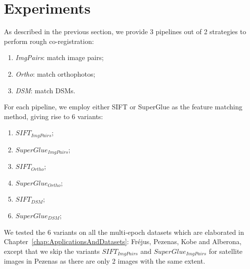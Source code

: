 \section{Experiments}
As described in the previous section, we provide 3 pipelines out of 2 strategies to perform rough co-registration:\\
\begin{enumerate}
	\item \textit{ImgPairs}: match image pairs;
	\item \textit{Ortho}: match orthophotos;
	\item \textit{DSM}: match DSMs.
\end{enumerate}
For each pipeline, we employ either SIFT or SuperGlue as the feature matching method, giving rise to 6 variants:\\
\begin{enumerate}
    \item $SIFT_{ImgPairs}$;
    \item $SuperGlue_{ImgPairs}$;
    \item $SIFT_{Ortho}$;
    \item $SuperGlue_{Ortho}$;
    \item $SIFT_{DSM}$;
    \item $SuperGlue_{DSM}$;
\end{enumerate}
We tested the 6 variants on all the multi-epoch datasets which are elaborated in Chapter~\ref{chap:ApplicationsAndDatasets}: Fr{\'e}jus, Pezenas, Kobe and Alberona, except that we skip the variants $SIFT_{ImgPairs}$ and $SuperGlue_{ImgPairs}$ for satellite images in Pezenas as there are only 2 images with the same extent.\\

